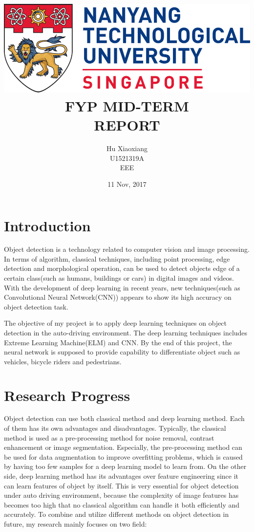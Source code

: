 \documentclass[titlepage]{article}
\author{Hu Xiaoxiang \\
U1521319A \\
EEE \\
}
\date{11 Nov, 2017 \\
}
\title{\includegraphics[width=\textwidth]{logo_ntu_new.png} \\
[5\baselineskip] FYP MID-TERM\\
REPORT \\
[5\baselineskip]}
\begin{document}
\maketitle
\tableofcontents

\newpage
{}

\section{Introduction}
\label{sec:org3490c8d}
Object detection is a technology related to computer vision and image
processing. In terms of algorithm, classical techniques, including point
processing, edge detection and morphological operation, can be used to detect
objects edge of a certain class(such as humans, buildings or cars) in digital
images and videos. With the development of deep learning in recent years, new
techniques(such as Convolutional Neural Network(CNN)) appears to show its high
accuracy on object detection task.

The objective of my project is to apply deep learning techniques on object
detection in the auto-driving environment. The deep learning techniques
includes Extreme Learning Machine(ELM) and CNN. By the end of this project,
the neural network is supposed to provide capability to differentiate object
such as vehicles, bicycle riders and pedestrians.

\section{Research Progress}
\label{sec:orgc92dcff}
Object detection can use both classical method and deep learning method. Each
of them has its own advantages and disadvantages. Typically, the classical
method is used as a pre-processing method for noise removal, contrast
enhancement or image segmentation. Especially, the pre-processing method can
be used for data augmentation to improve overfitting problems, which is caused
by having too few samples for a deep learning model to learn from. On the
other side, deep learning method has its advantages over feature engineering
since it can learn features of object by itself. This is very essential for
object detection under auto driving environment, because the complexity of
image features has becomes too high that no classical algorithm can handle it
both efficiently and accurately. To combine and utilize different methods on
object detection in future, my research mainly focuses on two field:
\end{document}
